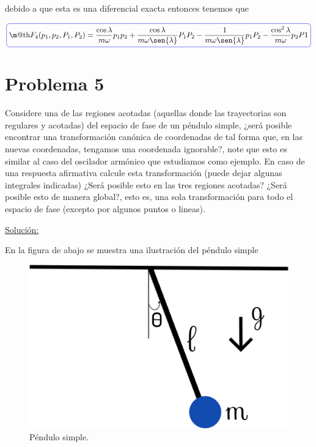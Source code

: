 \documentclass[a4paper,10pt]{article}
\makeatletter
\numberwithin{equation}{section}
\newcommand*{\boxcolor}{blue}
\renewcommand{\boxed}[1]{\textcolor{\boxcolor}{%
\tikz[baseline={([yshift=-1ex]current bounding box.center)}] \node [rectangle, minimum width=1ex,rounded corners,draw] {\normalcolor\m@th$\displaystyle#1$};}}
\makeatother
\begin{document}
debido a que esta es una diferencial exacta entonces tenemos que 

\begin{equation}
 \boxed{F_4(p_1,p_2,P_1,P_2) = \frac{\cos{\lambda}}{m\omega}p_1p_2 + 
 \frac{\cos{\lambda}}{m\omega\sen{\lambda}}P_1P_2 -
 \frac{1}{m\omega\sen{\lambda}}p_1P_2 - \frac{\cos^2{\lambda}}{m\omega}p_2P1}
\end{equation}

\section{Problema 5}

Considere una de las regiones acotadas (aquellas donde las trayectorias son regulares 
y acotadas) del espacio de fase de un péndulo simple, ¿será posible encontrar una 
transformación canónica de coordenadas de tal forma que, en las nuevas coordenadas, 
tengamos una coordenada ignorable?, note que esto es similar al caso del oscilador 
armónico que estudiamos como ejemplo. En caso de una respuesta afirmativa calcule 
esta transformación (puede dejar algunas integrales indicadas) ¿Será posible 
esto en las tres regiones acotadas? ¿Será posible esto de manera global?, esto es,
una sola transformación para todo el espacio de fase (excepto por algunos puntos o 
lineas).

\vspace{.3cm}

\underline{Solución:} \vspace{.3cm}

En la figura de abajo se muestra una ilustración del péndulo simple

\begin{figure}[H]
 \center 
 \includegraphics[scale=0.4]{problema5fig1}
 \caption{Péndulo simple.}
 \label{fig:problema5fig1}
\end{figure}
\end{document}
